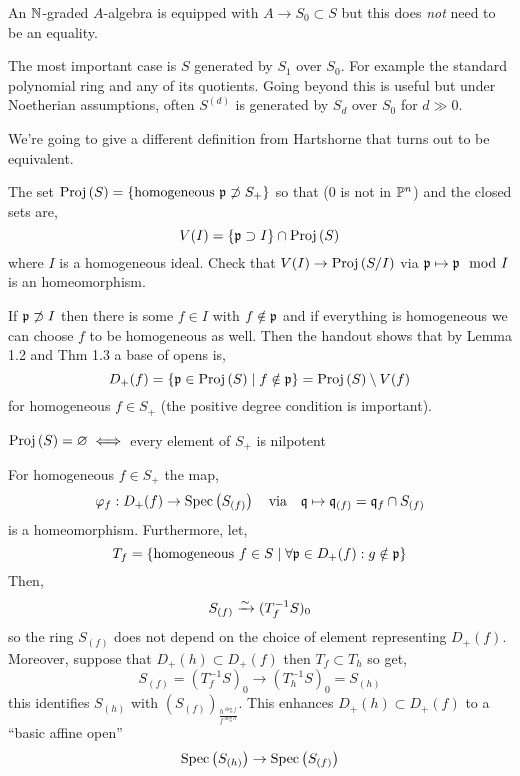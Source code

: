 \documentclass[12pt]{article}
\begin{document}
\begin{rmk}
An $\N$-graded $A$-algebra is equipped with $A \to S_0 \subset S$ but this does \textit{not} need to be an equality.
\end{rmk}

\begin{rmk}
The most important case is $S$ generated by $S_1$ over $S_0$. For example the standard polynomial ring and any of its quotients. Going beyond this is useful but under Noetherian assumptions, often $S^{(d)}$ is generated by $S_d$ over $S_0$ for $d \gg 0$.
\end{rmk}

We're going to give a different definition from Hartshorne that turns out to be equivalent.


\begin{defn}
The set $\Proj{S} = \{ \text{homogeneous } \p \not\supset S_+ \}$ so that ($0$ is not in $\P^n$) and the closed sets are,
\[ V(I) = \{ \p \supset I \} \cap \Proj{S} \]
where $I$ is a homogeneous ideal. Check that $V(I) \to \Proj{S/I}$ via $\p \mapsto \p \mod I$ is an homeomorphism. 
\end{defn}

\begin{rmk}
If $\p \not\supset I$ then there is some $f \in I$ with $f \notin \p$ and if everything is homogeneous we can choose $f$ to be homogeneous as well. Then the handout shows that by Lemma 1.2 and Thm 1.3 a base of opens is,
\[ D_+(f) = \{ \p \in \Proj{S} \mid f \notin \p \} = \Proj{S} \setminus V(f) \]
for homogeneous $f \in S_+$ (the positive degree condition is important). 
\end{rmk}

\begin{prop}
$\Proj{S} = \empty \iff$ every element of $S_+$ is nilpotent
\end{prop}

\begin{thm}[2.1 + 2.2]
For homogeneous $f \in S_+$ the map,
\[ \varphi_f : D_+(f) \to \Spec{S_{(f)}} \quad \text{via} \quad \q \mapsto \q_{(f)} = \q_f \cap S_{(f)} \]
is a homeomorphism. Furthermore, let,
\[ T_f = \{ \text{homogeneous } f \in S \mid \forall \p \in D_+(f) : g \notin \p \} \]
Then,
\[ S_{(f)} \iso (T_f^{-1} S)_0 \]
so the ring $S_{(f)}$ does not depend on the choice of element representing $D_+(f)$. Moreover, suppose that $D_+(h) \subset D_+(f)$ then $T_f \subset T_h$ so get,
\[ S_{(f)} = (T_f^{-1} S)_0 \to (T_h^{-1} S)_0 = S_{(h)} \]
this identifies $S_{(h)}$ with $(S_{(f)})_{\frac{h^{\deg{f}}}{f^{\deg{h}}}}$. This enhances $D_+(h) \subset D_+(f)$ to a ``basic affine open'' 
\[ \Spec{S_{(h)}} \to \Spec{S_{(f)}} \]
\end{thm}
\end{document}
